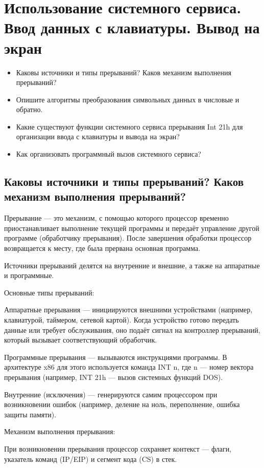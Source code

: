 \chapter{Использование системного сервиса. Ввод данных с клавиатуры. Вывод на экран}
\begin{itemize}
\item Каковы источники и типы прерываний? Каков механизм выполнения прерываний?
\item Опишите алгоритмы преобразования символьных данных в числовые и обратно.
\item Какие существуют функции системного сервиса прерывания Int 21h для организации ввода с клавиатуры и вывода на экран?
\item Как организовать программный вызов системного сервиса?
\end{itemize}

\section{Каковы источники и типы прерываний? Каков механизм выполнения прерываний?}

Прерывание — это механизм, с помощью которого процессор временно приостанавливает выполнение текущей программы и передаёт управление другой программе (обработчику прерывания). После завершения обработки процессор возвращается к месту, где была прервана основная программа.

Источники прерываний делятся на внутренние и внешние, а также на аппаратные и программные.

Основные типы прерываний:

Аппаратные прерывания — инициируются внешними устройствами (например, клавиатурой, таймером, сетевой картой). Когда устройство готово передать данные или требует обслуживания, оно подаёт сигнал на контроллер прерываний, который вызывает соответствующий обработчик.

Программные прерывания — вызываются инструкциями программы. В архитектуре x86 для этого используется команда INT n, где n — номер вектора прерывания (например, INT 21h — вызов системных функций DOS).

Внутренние (исключения) — генерируются самим процессором при возникновении ошибок (например, деление на ноль, переполнение, ошибка защиты памяти).

Механизм выполнения прерывания:

При возникновении прерывания процессор сохраняет контекст — флаги, указатель команд (IP/EIP) и сегмент кода (CS) в стек.

